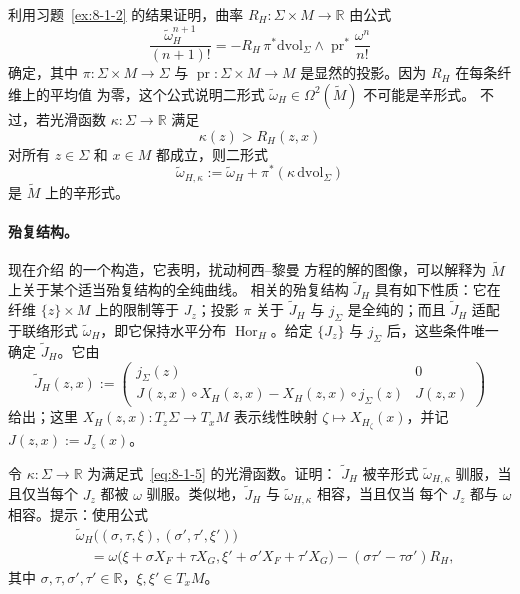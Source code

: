 \begin{exercise}\label{ex:8-1-3}
利用习题~\ref{ex:8-1-2} 的结果证明，曲率 $R_H:\Sigma\times M\to\mathbb R$ 由公式
\[
  \frac{\widetilde\omega_H^{n+1}}{(n+1)!}
  =-R_H\,\pi^*\mathrm{dvol}_\Sigma\wedge
    \operatorname{pr}^*\frac{\omega^n}{n!}
\]
确定，其中 $\pi:\Sigma\times M\to\Sigma$ 与
$\operatorname{pr}:\Sigma\times M\to M$ 是显然的投影。因为 $R_H$ 在每条纤维上的平均值
为零，这个公式说明二形式 $\widetilde\omega_H\in\Omega^2(\widetilde M)$ 不可能是辛形式。
不过，若光滑函数 $\kappa:\Sigma\to\mathbb R$ 满足
\begin{equation}\label{eq:8-1-5}
  \kappa(z)>R_H(z,x)
\end{equation}
对所有 $z\in\Sigma$ 和 $x\in M$ 都成立，则二形式
\[
  \widetilde\omega_{H,\kappa}
  :=\widetilde\omega_H+\pi^*(\kappa\,\mathrm{dvol}_\Sigma)
\]
是 $\widetilde M$ 上的辛形式。
\end{exercise}

\paragraph{殆复结构。}
现在介绍 的一个构造，它表明，扰动柯西--黎曼
方程的解的图像，可以解释为 $\widetilde M$ 上关于某个适当殆复结构的全纯曲线。
相关的殆复结构 $\widetilde J_H$ 具有如下性质：它在纤维 $\{z\}\times M$ 上的限制等于
$J_z$；投影 $\pi$ 关于 $\widetilde J_H$ 与 $j_\Sigma$ 是全纯的；而且
$\widetilde J_H$ 适配于联络形式 $\widetilde\omega_H$，即它保持水平分布
$\operatorname{Hor}_H$。给定 $\{J_z\}$ 与 $j_\Sigma$ 后，这些条件唯一确定
$\widetilde J_H$。它由
\[
  \widetilde J_H(z,x):=
  \begin{pmatrix}
    j_\Sigma(z) & 0\\
    J(z,x)\circ X_H(z,x)-X_H(z,x)\circ j_\Sigma(z) & J(z,x)
  \end{pmatrix}
\]
给出；这里 $X_H(z,x):T_z\Sigma\to T_xM$ 表示线性映射
$\zeta\mapsto X_{H_\zeta}(x)$，并记 $J(z,x):=J_z(x)$。

\begin{exercise}\label{ex:8-1-4}
令 $\kappa:\Sigma\to\mathbb R$ 为满足式~\eqref{eq:8-1-5} 的光滑函数。证明：
$\widetilde J_H$ 被辛形式 $\widetilde\omega_{H,\kappa}$ 驯服，当且仅当每个 $J_z$ 都被
$\omega$ 驯服。类似地，$\widetilde J_H$ 与 $\widetilde\omega_{H,\kappa}$ 相容，当且仅当
每个 $J_z$ 都与 $\omega$ 相容。提示：使用公式
\begin{align*}
  &\widetilde\omega_H
    \bigl((\sigma,\tau,\xi),(\sigma',\tau',\xi')\bigr)\\
  &\quad=
  \omega\bigl(\xi+\sigma X_F+\tau X_G,
               \xi'+\sigma'X_F+\tau'X_G\bigr)
  -(\sigma\tau'-\tau\sigma')R_H,
\end{align*}
其中 $\sigma,\tau,\sigma',\tau'\in\mathbb R$，$\xi,\xi'\in T_xM$。
\end{exercise}

